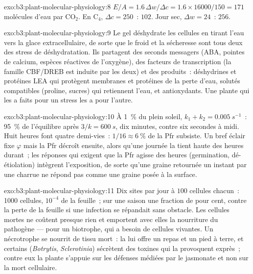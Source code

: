 \begin{solution}{exo:b3:plant-molecular-physiology:8}
$E/A = 1.6\,\Delta w/\Delta c = 1.6\times\num{16000}/150 = 171$ molécules
d'eau par CO$_{2}$. En C$_{4}$, $\Delta c = 250$~: $102$. Jour sec,
$\Delta w = 24$~: $256$.
\end{solution}

\begin{solution}{exo:b3:plant-molecular-physiology:9}
Le gel déshydrate les cellules en tirant l'eau vers la glace
extracellulaire, de sorte que le froid et la sécheresse sont tous deux
des stress de déshydratation. Ils partagent des seconds messagers (ABA,
pointes de calcium, espèces réactives de l'oxygène), des facteurs de
transcription (la famille CBF/DREB est induite par les deux) et des
produits~: déshydrines et protéines LEA qui protègent membranes et
protéines de la perte d'eau, solutés compatibles (proline, sucres) qui
retiennent l'eau, et antioxydants. Une plante qui les a faits pour un
stress les a pour l'autre.
\end{solution}

\begin{solution}{exo:b3:plant-molecular-physiology:10}
À \qty{1}{\%} du plein soleil, $k_{1} + k_{2} = \qty{0.005}{s^{-1}}$~:
95~\% de l'équilibre après $3/k = \qty{600}{s}$, dix minutes, contre six
secondes à midi. Huit heures font quatre demi-vies~: $1/16 \approx
\qty{6}{\%}$ de la Pfr subsiste. Un bref éclair fixe $\varphi$ mais la
Pfr décroît ensuite, alors qu'une journée la tient haute des heures
durant~; les réponses qui exigent que la Pfr agisse des heures
(germination, dé-étiolation) intègrent l'exposition, de sorte qu'une
graine retournée un instant par une charrue ne répond pas comme une
graine posée à la surface.
\end{solution}

\begin{solution}{exo:b3:plant-molecular-physiology:11}
Dix sites par jour à $100$ cellules chacun~: \num{1000} cellules,
$10^{-4}$ de la feuille~; sur une saison une fraction de pour cent,
contre la perte de la feuille si une infection se répandait sans
obstacle. Les cellules mortes ne coûtent presque rien et emportent avec
elles la nourriture du pathogène --- pour un biotrophe, qui a besoin de
cellules vivantes. Un nécrotrophe se nourrit de tissu mort~: la  lui offre un repas et un pied à terre, et certains
(\emph{Botrytis}, \emph{Sclerotinia}) sécrètent des toxines qui la
provoquent exprès~; contre eux la plante s'appuie sur les défenses
médiées par le jasmonate et non sur la mort cellulaire.
\end{solution}


